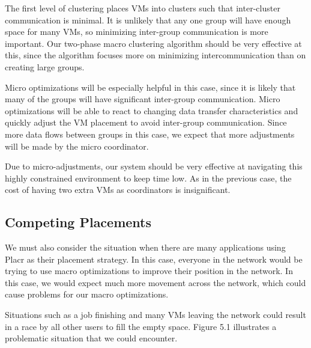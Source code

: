 \documentclass[11pt]{article}
\begin{document}
The first level of clustering places VMs into clusters such that inter-cluster communication is minimal.  It is unlikely that any one group will have enough space for many VMs, so minimizing inter-group communication is more important.  Our two-phase macro clustering algorithm should be very effective at this, since the algorithm focuses more on minimizing intercommunication than on creating large groups.

Micro optimizations will be especially helpful in this case, since it is likely that many of the groups will have significant inter-group communication.  Micro optimizations will be able to react to changing data transfer characteristics and quickly adjust the VM placement to avoid inter-group communication.  Since more data flows between groups in this case, we expect that more adjustments will be made by the micro coordinator.

Due to micro-adjustments, our system should be very effective at navigating this highly constrained environment to keep time low.  As in the previous case, the cost of having two extra VMs as coordinators is insignificant.


\subsection{Competing Placements}

We must also consider the situation when there are many applications using Placr as their placement strategy.  In this case, everyone in the network would be trying to use macro optimizations to improve their position in the network.  In this case, we would expect much more movement across the network, which could cause problems for our macro optimizations.

Situations such as a job finishing and many VMs leaving the network could result in a race by all other users to fill the empty space.  Figure 5.1 illustrates a problematic situation that we could encounter.
\end{document}
